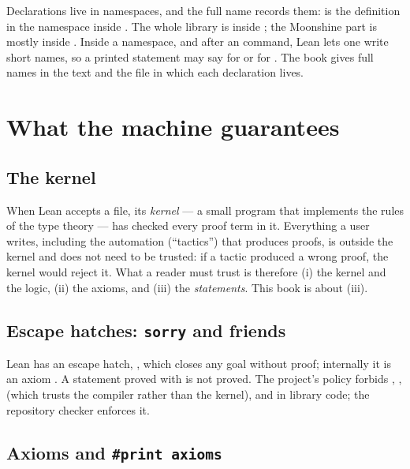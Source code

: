 Declarations live in namespaces, and the full name records them:
 is the definition  in the namespace
 inside . The whole library is inside ; the Moonshine
part is mostly inside . Inside a namespace, and after an  command,
Lean lets one write short names, so a printed statement may say  for
 or  for . The book gives full names in the text and
the file in which each declaration lives.

\section{What the machine guarantees}\label{ch01:sec:trust}

\subsection{The kernel}

When Lean accepts a file, its \emph{kernel} --- a small program that implements the rules of the type
theory --- has checked every proof term in it. Everything a user writes, including the
automation (``tactics'') that produces proofs, is outside the kernel and does not need to be
trusted: if a tactic produced a wrong proof, the kernel would reject it. What a reader must trust is
therefore (i) the kernel and the logic, (ii) the axioms, and (iii) the \emph{statements}. This book
is about (iii).

\subsection{Escape hatches: \texttt{sorry} and friends}

Lean has an escape hatch, , which closes any goal without proof; internally it is an
axiom . A statement proved with  is not proved. The project's policy
forbids , ,  (which trusts the compiler rather than the
kernel),  and  in library code; the repository checker enforces it.

\subsection{Axioms and \texttt{\#print axioms}}

